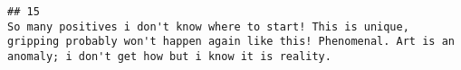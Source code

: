 \documentclass[
]{article}
\begin{document}
\begin{verbatim}
## 15                                                                                                                                                                                                                                                                                                                                                                                                                                                                                                                                                                                                                                                                                                                                                                                                                                                                                                                                                                                                                                                                                                                                                                                                                                                                                                                                                                                                                                                                                                                                                                                                                                                                                                                                                                                                                                                                                                                                                                                                                                                                                                                                                                                                                                                                                                                                                                                                                                                                                                                                                                                                                                                                                                                                                                                                                                                                          So many positives i don't know where to start! This is unique, gripping probably won't happen again like this! Phenomenal. Art is an anomaly; i don't get how but i know it is reality.

\end{verbatim}
\end{document}
